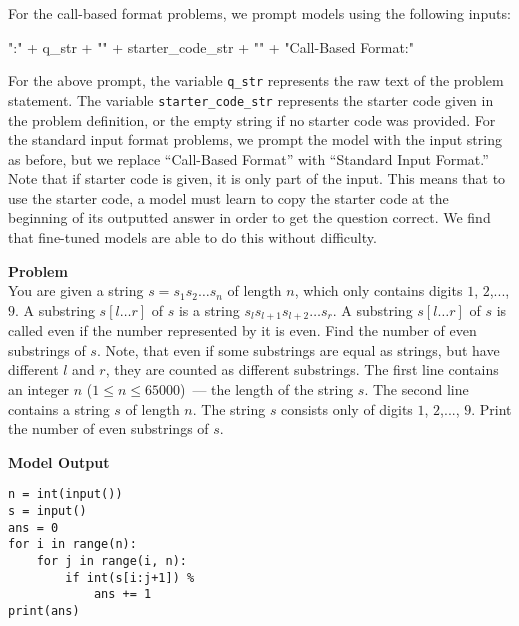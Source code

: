 For the call-based format problems, we prompt models using the following inputs:

\begin{spverbatim}
"\nQUESTION:\n" + q_str + "\n" + starter_code_str + "\n" + "\nUse Call-Based Format\n\nANSWER:\n"
\end{spverbatim}


For the above prompt, the variable \verb|q_str| represents the raw text of the problem statement. The variable \verb|starter_code_str| represents the starter code given in the problem definition, or the empty string if no starter code was provided. For the standard input format problems, we prompt the model with the input string as before, but we replace ``Call-Based Format'' with ``Standard Input Format.'' Note that if starter code is given, it is only part of the input. This means that to use the starter code, a model must learn to copy the starter code at the beginning of its outputted answer in order to get the question correct. We find that fine-tuned models are able to do this without difficulty.




















\begin{figure*}
    \textbf{Problem} \\
     You are given a string $s=s_1s_2\dots s_n$ of length $n$, which only contains digits $1$, $2$,..., $9$. A substring $s[l \dots r]$ of $s$ is a string $s_l s_{l + 1} s_{l + 2} \ldots s_r$. A substring $s[l \dots r]$ of $s$ is called even if the number represented by it is even. Find the number of even substrings of $s$. Note, that even if some substrings are equal as strings, but have different $l$ and $r$, they are counted as different substrings. The first line contains an integer $n$ ($1 \le n \le 65000$) — the length of the string $s$. The second line contains a string $s$ of length $n$. The string $s$ consists only of digits $1$, $2$,..., $9$. Print the number of even substrings of $s$.

 

 \textbf{Model Output}
 \begin{verbatim}
n = int(input())
s = input()
ans = 0
for i in range(n):
    for j in range(i, n):
        if int(s[i:j+1]) %
            ans += 1
print(ans)
 \end{verbatim}

\caption{Model-generated code from GPT-2 1.5B. 18/18 test cases pass for the problem. Note that models were given in problems exactly as they they are formatted here, which even meant parsing \LaTeX. For brevity, we exclude formatting instructions from this depicted problem.}
    \label{fig:samples_from_1500}
\end{figure*}



